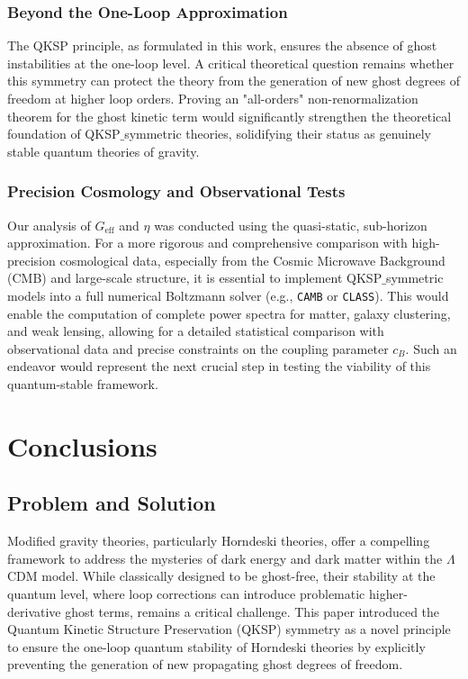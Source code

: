 \documentclass[twocolumn]{aastex631}
\begin{document}
\subsubsection{Beyond the One-Loop Approximation}
The QKSP principle, as formulated in this work, ensures the absence of ghost instabilities at the one-loop level. A critical theoretical question remains whether this symmetry can protect the theory from the generation of new ghost degrees of freedom at higher loop orders. Proving an "all-orders" non-renormalization theorem for the ghost kinetic term would significantly strengthen the theoretical foundation of QKSP\ensuremath{\_}symmetric theories, solidifying their status as genuinely stable quantum theories of gravity.

\subsubsection{Precision Cosmology and Observational Tests}
Our analysis of $G_{\text{eff}}$ and $\eta$ was conducted using the quasi-static, sub-horizon approximation. For a more rigorous and comprehensive comparison with high-precision cosmological data, especially from the Cosmic Microwave Background (CMB) and large-scale structure, it is essential to implement QKSP\ensuremath{\_}symmetric models into a full numerical Boltzmann solver (e.g., \texttt{CAMB} or \texttt{CLASS}). This would enable the computation of complete power spectra for matter, galaxy clustering, and weak lensing, allowing for a detailed statistical comparison with observational data and precise constraints on the coupling parameter $c_B$. Such an endeavor would represent the next crucial step in testing the viability of this quantum-stable framework.

\section{Conclusions}
\label{sec:conclusions}


\subsection{Problem and Solution}
Modified gravity theories, particularly Horndeski theories, offer a compelling framework to address the mysteries of dark energy and dark matter within the $\Lambda$CDM model. While classically designed to be ghost-free, their stability at the quantum level, where loop corrections can introduce problematic higher-derivative ghost terms, remains a critical challenge. This paper introduced the Quantum Kinetic Structure Preservation (QKSP) symmetry as a novel principle to ensure the one-loop quantum stability of Horndeski theories by explicitly preventing the generation of new propagating ghost degrees of freedom.
\end{document}
